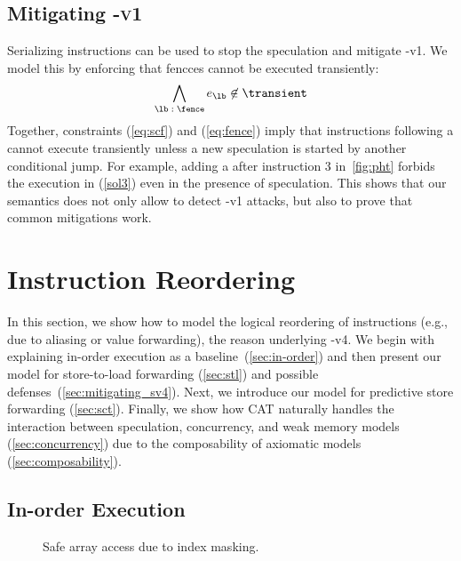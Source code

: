 \documentclass[conference]{IEEEtran}
\begin{document}
\subsection{Mitigating \spectre-\textsc{v1}}
\label{sec:mit1}

Serializing instructions can be used to stop the speculation and mitigate \spectre-v1.
We model this by enforcing that {fencces} cannot be executed transiently:
\begin{equation}
\label{eq:fence}
\bigwedge\limits_{\lb \; : \; \fence} e_\lb \not \in \transient
\end{equation}
Together, constraints (\ref{eq:scf}) and (\ref{eq:fence}) imply that instructions following a \fence cannot execute transiently unless a new speculation is started by another conditional jump.
For example, adding a \fence after instruction $3$ in~\autoref{fig:pht} forbids the execution in (\ref{sol3}) even in the presence of speculation.
This shows that our semantics does not only allow to detect \spectre-v1 attacks, but also to prove that common mitigations work.

\section{Instruction Reordering}
\label{sec:cat-models}

In this section, we show how to model the logical reordering of instructions (e.g., due to aliasing or value forwarding), the reason underlying \spectre-v4. We begin with explaining in-order execution as a baseline~(\autoref{sec:in-order}) and then present our model for store-to-load forwarding (\autoref{sec:stl}) and possible defenses~(\autoref{sec:mitigating_sv4}). Next, we introduce our model for predictive store forwarding (\autoref{sec:sct}).
Finally, we show how CAT naturally handles the interaction between speculation, concurrency, and weak memory models (\autoref{sec:concurrency}) due to the composability of axiomatic models (\autoref{sec:composability}).

\subsection{In-order Execution}
\label{sec:in-order}

\begin{figure}[t]
\centering
\scalebox{.8}{}
\caption{Safe array access due to index masking.}
\label{fig:stl-safe}
\end{figure}
\end{document}
